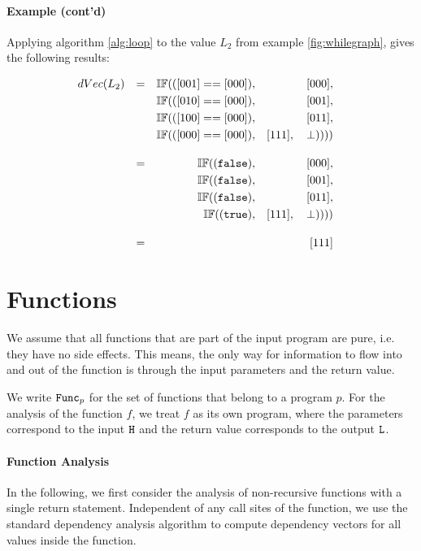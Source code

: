 \paragraph{Example (cont'd)}
Applying algorithm \ref{alg:loop} to the value $L_2$ from example \ref{fig:whilegraph}, gives the following results:
\begin{center}
\begin{align*}
    dVec(L_2) && = && \mathbb{IF}(([001] == [000]), && [000], \\
        && && \mathbb{IF}(([010] == [000]), && [001], \\
        && && \mathbb{IF}(([100] == [000]), && [011], \\
        && && \mathbb{IF}(([000] == [000]), && [111], \quad \bot)))) && \\[1em]
        && = && \mathbb{IF}((\mathtt{false}), && [000], \\
        && && \mathbb{IF}((\mathtt{false}), && [001], \\
        && && \mathbb{IF}((\mathtt{false}), && [011], \\
        && && \mathbb{IF}((\mathtt{true}), && [111], \quad \bot)))) && \\[1em]
        && = && && [111]
    \end{align*}
\end{center}

\section{Functions}\label{sec:functions}
We assume that all functions that are part of the input program are pure, i.e. they have no side effects. This means, the only way for information to flow into and out of the function is through the input parameters and the return value.

We write $\mathtt{Func}_p$ for the set of functions that belong to a program $p$. For the analysis of the function $f$, we treat $f$ as its own program, where the parameters correspond to the input $\mathtt{H}$ and the return value corresponds to the output $\mathtt{L}$.

\paragraph{Function Analysis}
In the following, we first consider the analysis of non-recursive functions with a single return statement. Independent of any call sites of the function, we use the standard dependency analysis algorithm to compute dependency vectors for all values inside the function.


